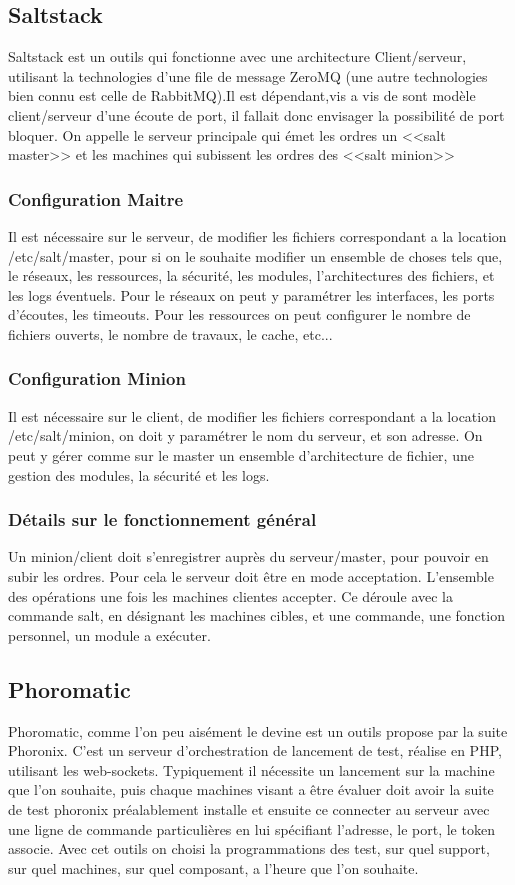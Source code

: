 \subsection{Saltstack}
Saltstack est un outils qui fonctionne avec une architecture Client/serveur, utilisant la technologies d'une file de message ZeroMQ (une autre technologies bien connu est celle de RabbitMQ).Il est dépendant,vis a vis de sont modèle client/serveur d'une écoute de port, il fallait donc envisager la possibilité de port bloquer. On appelle le serveur principale qui émet les ordres un <<salt master>> et les machines qui subissent les ordres des <<salt minion>>
\subsubsection{Configuration Maitre}
Il est nécessaire sur le serveur, de modifier les fichiers correspondant a la location /etc/salt/master, pour si on le souhaite modifier un ensemble de choses tels que, le réseaux, les ressources, la sécurité, les modules, l'architectures des fichiers, et les logs éventuels. 
Pour le réseaux on peut y paramétrer les interfaces, les ports d’écoutes, les timeouts.
Pour les ressources on peut configurer le nombre de fichiers ouverts, le nombre de travaux, le cache, etc...
 
\subsubsection{Configuration Minion}

Il est nécessaire sur le client, de modifier les fichiers correspondant a la location /etc/salt/minion, on doit y paramétrer le nom du serveur, et son adresse. On peut y gérer comme sur le master un ensemble d'architecture de fichier, une gestion des modules, la sécurité et les logs.

\subsubsection{Détails sur le fonctionnement général}

Un minion/client doit s'enregistrer auprès du serveur/master, pour pouvoir en subir les ordres. Pour cela le serveur doit être en mode acceptation. L'ensemble des opérations une fois les machines clientes accepter. Ce déroule avec la commande salt, en désignant les machines cibles, et une commande, une fonction personnel, un module a exécuter. 
\subsection{Phoromatic}
Phoromatic, comme l'on peu aisément le devine est un outils propose par la suite Phoronix. C'est un serveur d'orchestration de lancement de test, réalise en PHP, utilisant les web-sockets. Typiquement il nécessite un lancement sur la machine que l'on souhaite, puis chaque machines visant a être évaluer doit avoir la suite de test phoronix préalablement installe et ensuite ce connecter au serveur avec une ligne de commande particulières en lui spécifiant l'adresse, le port, le token associe. Avec cet outils on choisi la programmations des test, sur quel support, sur quel machines, sur quel composant, a l'heure que l'on souhaite. 

